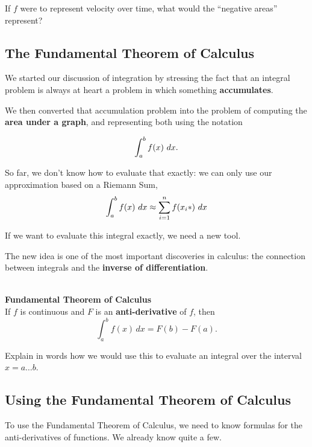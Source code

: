 \vfill
\vfill

{If $f$ were to represent velocity over time, what would the ``negative
  areas'' represent?}

\vfill
\newpage

\subsection*{The Fundamental Theorem of Calculus}
We started our discussion of integration by stressing
the fact that an integral problem is always at heart a problem in
which something {\bf accumulates}. 

We then converted that accumulation problem into the problem of
computing the {\bf area under a graph}, and representing 
both using the notation

$$\displaystyle \int_a^b f(x)~dx.$$

So far, we don't know how to evaluate that exactly: we can only use our approximation
based on a Riemann Sum,
$$\displaystyle \int_a^b f(x)~dx \approx \sum_{i=1}^n f(x_i*) ~dx$$

If we want to evaluate this integral exactly, we need a new tool.

\newpage

The new idea is one of the most important discoveries in calculus: the
connection between integrals and the {\bf inverse of
  differentiation}. \\[1ex]

\begin{boxnote} ~\\ 
{\bf Fundamental Theorem of Calculus} \\

If $f$ is continuous and $F$ is an {\bf anti-derivative} of $f$, then 
\[ \int_a^b f(x)\,dx=F(b)-F(a).
\] 
\end{boxnote}

\problem Explain in words how we would use this to evaluate an
integral over the interval $x =a \ldots b$.

\vfill

\newpage

\subsection*{Using the Fundamental Theorem of Calculus}
To use the Fundamental Theorem of Calculus, we need to know formulas
for the anti-derivatives of functions.  We already know quite a few.

